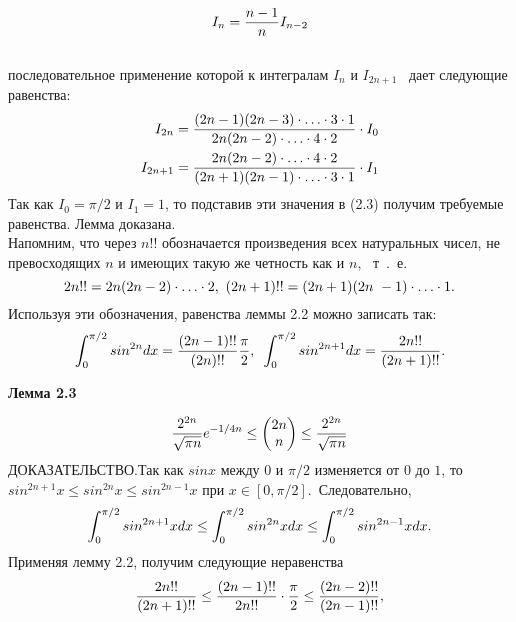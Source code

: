 \documentclass[12pt]{article}
\begin{document}
\begin{equation}
    I_n=\frac{n-1}{n}I_{n-2} \notag
\end{equation}\\
последовательное применение которой к интегралам $I_n$ и $I_{2n+1}$ ~дает следующие равенства:
\begin{align}
    I_{2n}= \frac{(2n-1)(2n-3) \cdot \ldots \cdot 3 \cdot 1}{2n(2n-2) \cdot \ldots \cdot 4 \cdot 2} \cdot I_0 \\
    I_{2n+1}= \frac{2n(2n-2) \cdot \ldots \cdot 4 \cdot 2}{(2n+1)(2n-1) \cdot \ldots \cdot 3\cdot 1} \cdot I_1 \notag
\end{align}
Так как $I_0=\pi/2$ и $I_1=1$, то подставив эти значения в (2.3) получим требуемые равенства. Лемма доказана.\\
Напомним, что через $n!!$ обозначается произведения всех натуральных чисел, не превосходящих $n$ и имеющих такую же четность как и $n$, ~т~.~е.
\begin{equation}
2n!! = 2n(2n-2)\cdot \ldots \cdot2,\text{  } (2n + 1)!! = (2n + 1)(2n~- 1)\cdot \ldots \cdot 1. \notag
\end{equation}
Используя эти обозначения, равенства леммы 2.2 можно записать так:
\begin{equation}
    \int_0^{\pi/2}{sin^{2n}d x}=\frac{(2n-1)!!}{(2n)!!}\frac{\pi}{2},\text{  } \int_0^{\pi/2}{sin^{2n+1}d x}=\frac{2n!!}{(2n+1)!!}. \notag
\end{equation}
\begin{flushleft}
\large \bf{Лемма 2.3}
\end{flushleft}
\begin{equation}
    \frac{2^{2n}}{\sqrt{\pi n}}e^{-1/4n}\le \begin{pmatrix} 2n\\n \end{pmatrix} \le  \frac{2^{2n}}{\sqrt{\pi n}}  \notag
\end{equation}
ДОКАЗАТЕЛЬСТВО.Так как $sin{x}$ между $0$ и $\pi/2$ изменяется от $0$ до $1$, то $sin^{2n+1}{x} \le sin^{2n}{x} \le sin^{2n-1}{x}$ при $x \in [0, \pi/2]$.~Следовательно,
\begin{equation}
    \int_0^{\pi/2}{sin^{2n+1}{x}d x}\le \int_0^{\pi/2}{sin^{2n}{x}d x}\le \int_0^{\pi/2}{sin^{2n-1}{x}d x}.  \notag
\end{equation}
Применяя лемму 2.2, получим следующие неравенства
\begin{equation}
  \frac{2n!!}{(2n+1)!!}  \le \frac{(2n-1)!!}{2n!!}\cdot \frac{\pi}{2}\le \frac{(2n-2)!!}{(2n-1)!!},  \notag
\end{equation}\\
\end{document}
